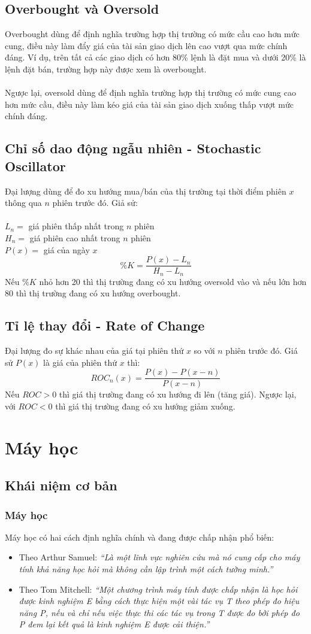 \subsection{Overbought và Oversold}
Overbought dùng để định nghĩa trường hợp thị trường có mức cầu cao hơn mức cung, 
điều này làm đẩy giá của tài sản giao dịch lên cao vượt qua mức chính đáng. Ví 
dụ, trên tất cả các giao dịch có hơn 80\% lệnh là đặt mua và dưới 20\% là lệnh 
đặt bán, trường hợp này được xem là overbought.\\\\
Ngược lại, oversold dùng để định nghĩa trường hợp thị trường có mức cung cao hơn 
mức cầu, điều này làm kéo giá của tài sản giao dịch xuống thấp vượt mức chính 
đáng.
\subsection{Chỉ số dao động ngẫu nhiên - Stochastic Oscillator}
Đại lượng dùng để đo xu hướng mua/bán của thị trường tại thời điểm phiên $x$ 
thông qua $n$ phiên trước đó. Giả sử:\\\\
\tab $L_{n} = $ giá phiên thấp nhất trong $n$ phiên\\
\tab $H_{n} = $ giá phiên cao nhất trong $n$ phiên\\
\tab $P(x) = $ giá của ngày $x$\\
\[\%K=\frac{P(x)-L_{n}}{H_{n}-L_{n}}\]
Nếu $ \%K $ nhỏ hơn 20 thì thị trường đang có xu hướng oversold vào và nếu lớn 
hơn 80 thì thị trường đang có xu hướng overbought.
\subsection{Tỉ lệ thay đổi - Rate of Change}
Đại lượng đo sự khác nhau của giá tại phiên thứ $x$ so với $n$ phiên trước đó. 
Giá sử $P(x)$ là giá của phiên thứ $x$ thì:
\[ ROC_{n}(x)=\frac{P(x)-P(x-n)}{P(x-n)}\]
Nếu $ROC > 0$ thì giá thị trường đang có xu hướng đi lên (tăng giá).
Ngược lại, với $ROC < 0$ thì giá thị trường đang có xu hướng giảm xuống.
\section{Máy học}
\subsection{Khái niệm cơ bản}
\subsubsection{Máy học}
Máy học có hai cách định nghĩa chính và đang được chấp nhận phổ biến:
\begin{itemize}
  \item Theo Arthur Samuel: \textit{``Là một lĩnh vực nghiên cứu mà nó cung cấp cho
  máy tính khả năng học hỏi mà không cần lập trình một cách tường minh.''}
  \item Theo Tom Mitchell: \textit{``Một chương trình máy tính được chấp nhận
  là học hỏi được kinh nghiệm E bằng cách thực hiện một vài tác vụ T theo phép đo hiệu
  năng P, nếu và chỉ nếu việc thực thi các tác vụ trong T được đo bởi phép đo P
  đem lại kết quả là kinh nghiệm E được cải thiện.''}
\end{itemize}
